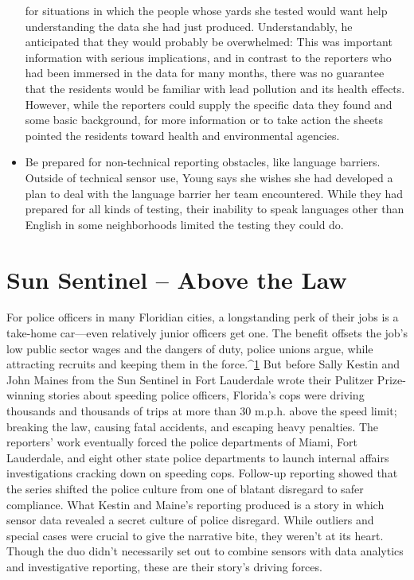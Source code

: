 \begin{itemize}
for situations in which the people whose yards she tested would want
help understanding the data she had just produced. Understandably,
he anticipated that they would probably be overwhelmed: This was
important information with serious implications, and in contrast to
the reporters who had been immersed in the data for many months,
there was no guarantee that the residents would be familiar with lead
pollution and its health effects. However, while the reporters could
supply the specific data they found and some basic background, for
more information or to take action the sheets pointed the residents
toward health and environmental agencies.
\item Be prepared for non-technical reporting obstacles, like
language barriers.
Outside of technical sensor use, Young says she wishes she had developed
a plan to deal with the language barrier her team encountered.
While they had prepared for all kinds of testing, their inability to
speak languages other than English in some neighborhoods limited
the testing they could do.
\end{itemize}

\section{Sun Sentinel – Above the Law}
For police officers in many Floridian cities, a longstanding perk of their jobs
is a take-home car—even relatively junior officers get one. The benefit offsets
the job's low public sector wages and the dangers of duty, police unions
argue, while attracting recruits and keeping them in the force.^{\href{#endnotes-sun-sentinel}{1}}
But before Sally Kestin and John Maines from the Sun Sentinel in Fort Lauderdale
wrote their Pulitzer Prize-winning stories about speeding police
officers, Florida's cops were driving thousands and thousands of trips at
more than 30 m.p.h. above the speed limit; breaking the law, causing fatal
accidents, and escaping heavy penalties.
The reporters' work eventually forced the police departments of Miami,
Fort Lauderdale, and eight other state police departments to launch internal
affairs investigations cracking down on speeding cops. Follow-up reporting
showed that the series shifted the police culture from one of blatant disregard
to safer compliance.
What Kestin and Maine's reporting produced is a story in which sensor data
revealed a secret culture of police disregard. While outliers and special cases
were crucial to give the narrative bite, they weren't at its heart. Though the
duo didn't necessarily set out to combine sensors with data analytics and
investigative reporting, these are their story's driving forces.

